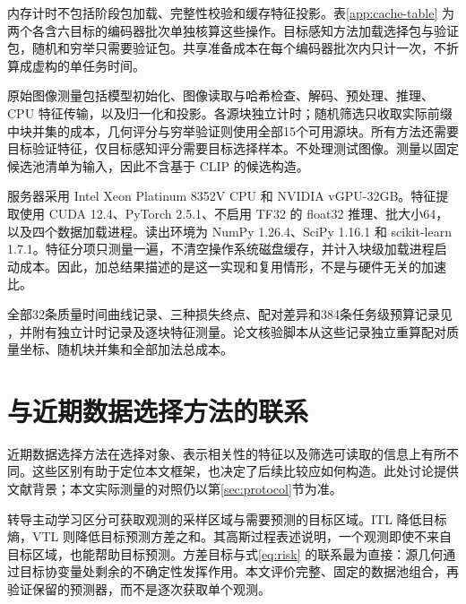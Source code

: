 内存计时不包括阶段包加载、完整性校验和缓存特征投影。表\ref{app:cache-table} 为两个各含六目标的编码器批次单独核算这些操作。目标感知方法加载选择包与验证包，随机和穷举只需要验证包。共享准备成本在每个编码器批次内只计一次，不折算成虚构的单任务时间。

\begin{table}[ht]
\centering
\caption{磁盘缓存批次成本以秒计，包括输入加载、完整性检查、投影和全部十二个编码器--目标决策。这里是两个六目标批次的总时间，而表\ref{tab:cost} 是单任务均值；选择及损失不变。}
\label{app:cache-table}

\end{table}

原始图像测量包括模型初始化、图像读取与哈希检查、解码、预处理、推理、CPU 特征传输，以及归一化和投影。各源块独立计时；随机筛选只收取实际前缀中块并集的成本，几何评分与穷举验证则使用全部15个可用源块。所有方法还需要目标验证特征，仅目标感知评分需要目标选择样本。不处理测试图像。测量以固定候选池清单为输入，因此不含基于 CLIP 的候选构造。

服务器采用 Intel Xeon Platinum 8352V CPU 和 NVIDIA vGPU-32GB。特征提取使用 CUDA 12.4、PyTorch 2.5.1、不启用 TF32 的 float32 推理、批大小64，以及四个数据加载进程。读出环境为 NumPy 1.26.4、SciPy 1.16.1 和 scikit-learn 1.7.1。特征分项只测量一遍，不清空操作系统磁盘缓存，并计入块级加载进程启动成本。因此，加总结果描述的是这一实现和复用情形，不是与硬件无关的加速比。

全部32条质量时间曲线记录、三种损失终点、配对差异和384条任务级预算记录见 ，并附有独立计时记录及逐块特征测量。论文核验脚本从这些记录独立重算配对质量坐标、随机块并集和全部加法总成本。

\section{与近期数据选择方法的联系}
\label{app:related-selection}
近期数据选择方法在选择对象、表示相关性的特征以及筛选可读取的信息上有所不同。这些区别有助于定位本文框架，也决定了后续比较应如何构造。此处讨论提供文献背景；本文实际测量的对照仍以第\ref{sec:protocol}节为准。

转导主动学习区分可获取观测的采样区域与需要预测的目标区域\citep{hubotter2024transductive}。ITL 降低目标熵，VTL 则降低目标预测方差之和。其高斯过程表述说明，一个观测即使不来自目标区域，也能帮助目标预测。方差目标与式\eqref{eq:risk} 的联系最为直接：源几何通过目标协变量处剩余的不确定性发挥作用。本文评价完整、固定的数据池组合，再验证保留的预测器，而不是逐次获取单个观测。

